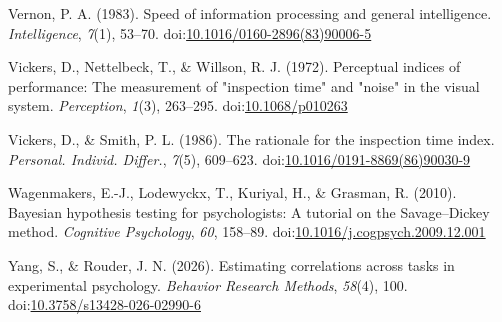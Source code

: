 \documentclass[
  ,man]{apa6}
\newlength{\cslhangindent}
\newenvironment{CSLReferences}[2] %
 {\begin{list}{}{%
  \setlength{\itemindent}{0pt}
  \setlength{\leftmargin}{0pt}
  \setlength{\parsep}{0pt}
  \ifodd #1
   \setlength{\leftmargin}{\cslhangindent}
   \setlength{\itemindent}{-1\cslhangindent}
  \fi
  \setlength{\itemsep}{#2\baselineskip}}}
 {\end{list}}
\begin{document}
\begin{CSLReferences}{1}{0}
Vernon, P. A. (1983). Speed of information processing and general intelligence. \emph{Intelligence}, \emph{7}(1), 53--70. doi:\href{https://doi.org/10.1016/0160-2896(83)90006-5}{10.1016/0160-2896(83)90006-5}

Vickers, D., Nettelbeck, T., \& Willson, R. J. (1972). Perceptual indices of performance: {The} measurement of "inspection time" and "noise" in the visual system. \emph{Perception}, \emph{1}(3), 263--295. doi:\href{https://doi.org/10.1068/p010263}{10.1068/p010263}

Vickers, D., \& Smith, P. L. (1986). The rationale for the inspection time index. \emph{Personal. Individ. Differ.}, \emph{7}(5), 609--623. doi:\href{https://doi.org/10.1016/0191-8869(86)90030-9}{10.1016/0191-8869(86)90030-9}

Wagenmakers, E.-J., Lodewyckx, T., Kuriyal, H., \& Grasman, R. (2010). Bayesian hypothesis testing for psychologists: {A} tutorial on the {Savage}--{Dickey} method. \emph{Cognitive Psychology}, \emph{60}, 158--89. doi:\href{https://doi.org/10.1016/j.cogpsych.2009.12.001}{10.1016/j.cogpsych.2009.12.001}

Yang, S., \& Rouder, J. N. (2026). Estimating correlations across tasks in experimental psychology. \emph{Behavior Research Methods}, \emph{58}(4), 100. doi:\href{https://doi.org/10.3758/s13428-026-02990-6}{10.3758/s13428-026-02990-6}

\end{CSLReferences}
\end{document}
